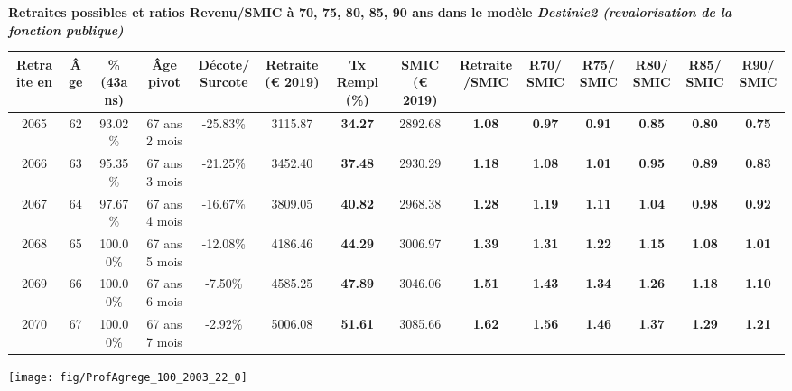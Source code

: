  \vspace{0.1cm} 
{\bf \noindent Retraites possibles et ratios Revenu/SMIC à 70, 75, 80, 85, 90 ans dans le modèle \emph{Destinie2 (revalorisation de la fonction publique)}}  
 
\begin{adjustbox}{max width=\textwidth} 
\begin{tabular}[htb]{|c|c||c|c|c||c|c||c|c||c|c|c|c|c|} 
\hline 
 Retraite en &  Âge &  \%(43ans) &  Âge pivot &  Décote/Surcote &  Retraite (\euro{} 2019) &  Tx Rempl(\%) &  SMIC (\euro{} 2019) &  Retraite/SMIC &  R70/SMIC &  R75/SMIC &  R80/SMIC &  R85/SMIC &  R90/SMIC \\ 
\hline \hline 
 2065 &  62 &  93.02\% &  67 ans 2 mois &  -25.83\% &  3115.87 &  {\bf 34.27} &  2892.68 &  {\bf 1.08} &  {\bf {\color{red} 0.97}} &  {\bf {\color{red} 0.91}} &  {\bf {\color{red} 0.85}} &  {\bf {\color{red} 0.80}} &  {\bf {\color{red} 0.75}} \\ 
\hline 
 2066 &  63 &  95.35\% &  67 ans 3 mois &  -21.25\% &  3452.40 &  {\bf 37.48} &  2930.29 &  {\bf 1.18} &  {\bf 1.08} &  {\bf 1.01} &  {\bf {\color{red} 0.95}} &  {\bf {\color{red} 0.89}} &  {\bf {\color{red} 0.83}} \\ 
\hline 
 2067 &  64 &  97.67\% &  67 ans 4 mois &  -16.67\% &  3809.05 &  {\bf 40.82} &  2968.38 &  {\bf 1.28} &  {\bf 1.19} &  {\bf 1.11} &  {\bf 1.04} &  {\bf {\color{red} 0.98}} &  {\bf {\color{red} 0.92}} \\ 
\hline 
 2068 &  65 &  100.00\% &  67 ans 5 mois &  -12.08\% &  4186.46 &  {\bf 44.29} &  3006.97 &  {\bf 1.39} &  {\bf 1.31} &  {\bf 1.22} &  {\bf 1.15} &  {\bf 1.08} &  {\bf 1.01} \\ 
\hline 
 2069 &  66 &  100.00\% &  67 ans 6 mois &  -7.50\% &  4585.25 &  {\bf 47.89} &  3046.06 &  {\bf 1.51} &  {\bf 1.43} &  {\bf 1.34} &  {\bf 1.26} &  {\bf 1.18} &  {\bf 1.10} \\ 
\hline 
 2070 &  67 &  100.00\% &  67 ans 7 mois &  -2.92\% &  5006.08 &  {\bf 51.61} &  3085.66 &  {\bf 1.62} &  {\bf 1.56} &  {\bf 1.46} &  {\bf 1.37} &  {\bf 1.29} &  {\bf 1.21} \\ 
\hline 
\hline 
\end{tabular} 
\end{adjustbox} 
 
 \vspace{0.1cm} 

 {\hspace{-2.2cm}\texttt{[image: fig/ProfAgrege\_100\_2003\_22\_0]}} 

